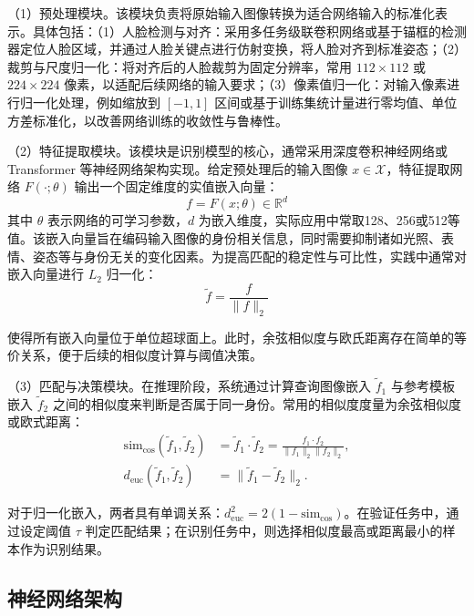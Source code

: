 （1）预处理模块。该模块负责将原始输入图像转换为适合网络输入的标准化表示。具体包括：（1）人脸检测与对齐：采用多任务级联卷积网络或基于锚框的检测器定位人脸区域，并通过人脸关键点进行仿射变换，将人脸对齐到标准姿态；（2）裁剪与尺度归一化：将对齐后的人脸裁剪为固定分辨率，常用 $112\times112$ 或 $224\times224$ 像素，以适配后续网络的输入要求；（3）像素值归一化：对输入像素进行归一化处理，例如缩放到 $[-1,1]$ 区间或基于训练集统计量进行零均值、单位方差标准化，以改善网络训练的收敛性与鲁棒性。

（2）特征提取模块。该模块是识别模型的核心，通常采用深度卷积神经网络或 Transformer 等神经网络架构实现。给定预处理后的输入图像 $x\in\mathcal{X}$，特征提取网络 $F(\cdot;\theta)$ 输出一个固定维度的实值嵌入向量：
\begin{equation}\label{eq:embedding}
      f = F(x;\theta)\in\mathbb{R}^d
\end{equation}
其中 $\theta$ 表示网络的可学习参数，$d$ 为嵌入维度，实际应用中常取128、256或512等值。该嵌入向量旨在编码输入图像的身份相关信息，同时需要抑制诸如光照、表情、姿态等与身份无关的变化因素。为提高匹配的稳定性与可比性，实践中通常对嵌入向量进行 $L_2$ 归一化：
\begin{equation}\label{eq:norm_embedding}
      \tilde{f} = \frac{f}{\|f\|_2}
\end{equation}

使得所有嵌入向量位于单位超球面上。此时，余弦相似度与欧氏距离存在简单的等价关系，便于后续的相似度计算与阈值决策。

（3）匹配与决策模块。在推理阶段，系统通过计算查询图像嵌入 $\tilde{f}_1$ 与参考模板嵌入 $\tilde{f}_2$ 之间的相似度来判断是否属于同一身份。常用的相似度度量为余弦相似度或欧式距离：
\begin{align}
\mathrm{sim}_{\text{cos}}(\tilde{f}_1,\tilde{f}_2) &= \tilde{f}_1 \cdot \tilde{f}_2 = \frac{f_1 \cdot f_2}{\|f_1\|_2\|f_2\|_2}, \label{eq:cosine_sim}\\
d_{\text{euc}}(\tilde{f}_1,\tilde{f}_2) &= \|\tilde{f}_1 - \tilde{f}_2\|_2. \label{eq:euclidean_dist}
\end{align}

对于归一化嵌入，两者具有单调关系：$d_{\text{euc}}^2 = 2(1-\mathrm{sim}_{\text{cos}})$。在验证任务中，通过设定阈值 $\tau$ 判定匹配结果；在识别任务中，则选择相似度最高或距离最小的样本作为识别结果。

\subsection{神经网络架构}

